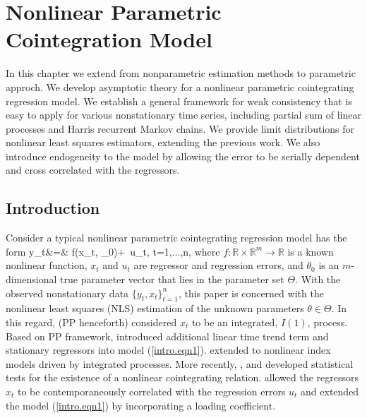 
\chapter{Nonlinear Parametric Cointegration Model} 
\ifpdf
    \graphicspath{{Chapter6/Chapter6Figs/PNG/}{Chapter6/Chapter6Figs/PDF/}{Chapter6/Chapter6Figs/}}
\else
    \graphicspath{{Chapter6/Chapter6Figs/EPS/}{Chapter6/Chapter6Figs/}}
\fi

 In this chapter we extend from nonparametric estimation methods to parametric approch. We develop asymptotic theory for a nonlinear parametric cointegrating regression model. We establish a general framework for  weak consistency that is easy to apply for various nonstationary time series, including partial sum of linear processes and  Harris recurrent Markov chains. We provide  limit distributions for  nonlinear least squares  estimators,    extending the previous work.  We also introduce endogeneity to the model by allowing the error to be serially dependent and cross correlated with the regressors.



\section{Introduction} 
Consider a typical nonlinear parametric cointegrating regression model has the form
 \be y_t&=&
f(x_t, \theta_0)+\,  u_t, \quad t=1,...,n,
\ee
where  $f:\mathbb{R} \times \mathbb{R}^m \rightarrow \mathbb{R}$ is a known nonlinear function,
$x_t$ and  $u_t$ are regressor and regression errors, and   $\theta_0$ is an $m$-dimensional true parameter vector that lies in the parameter set $\Theta$. With the observed nonstationary data $\{y_t, x_t\}_{t=1}^n$, this paper is concerned with the nonlinear least squares (NLS) estimation of the unknown parameters $\theta\in \Theta$. In this regard, \cite{parkphillips2001} (PP henceforth) considered $x_t$ to be an integrated, $I(1)$, process. Based on PP framework, \cite{changparkphillips2001} introduced additional linear time trend term and stationary regressors into model (\ref{intro.eqn1}). \cite{changpark2003} extended to nonlinear index models driven by integrated processes.  More recently, \cite{choisaikkonen2010}, \cite{gaomaxwelllutjostheim2009b} and \cite{wangphillips2012} developed statistical tests  for the existence of a nonlinear cointegrating relation. \cite{changpark2010} allowed the regressors $x_t$ to be contemporaneously correlated with the regression errors $u_t$ and \cite{shiphillips2010} extended the model (\ref{intro.eqn1}) by incorporating a loading coefficient.


